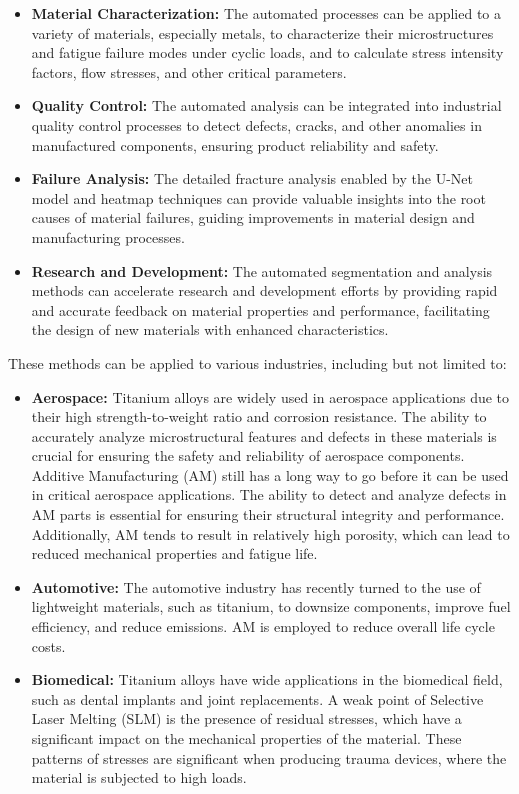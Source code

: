 \documentclass[preprint,12pt]{elsarticle}
\begin{document}
\begin{itemize}
    \item \textbf{Material Characterization:} The automated processes can be applied to a variety of materials, especially metals, to characterize their microstructures and fatigue failure modes under cyclic loads, and to calculate stress intensity factors, flow stresses, and other critical parameters.
    \item \textbf{Quality Control:} The automated analysis can be integrated into industrial quality control processes to detect defects, cracks, and other anomalies in manufactured components, ensuring product reliability and safety.
    \item \textbf{Failure Analysis:} The detailed fracture analysis enabled by the U-Net model and heatmap techniques can provide valuable insights into the root causes of material failures, guiding improvements in material design and manufacturing processes.
    \item \textbf{Research and Development:} The automated segmentation and analysis methods can accelerate research and development efforts by providing rapid and accurate feedback on material properties and performance, facilitating the design of new materials with enhanced characteristics.
\end{itemize}

These methods can be applied to various industries, including but not limited to:

\begin{itemize}
    \item \textbf{Aerospace:} Titanium alloys are widely used in aerospace applications due to their high strength-to-weight ratio and corrosion resistance. The ability to accurately analyze microstructural features and defects in these materials is crucial for ensuring the safety and reliability of aerospace components. Additive Manufacturing (AM) still has a long way to go before it can be used in critical aerospace applications. The ability to detect and analyze defects in AM parts is essential for ensuring their structural integrity and performance. Additionally, AM tends to result in relatively high porosity, which can lead to reduced mechanical properties and fatigue life. ~\cite{montanari2023additive}
    \item \textbf{Automotive:} The automotive industry has recently turned to the use of lightweight materials, such as titanium, to downsize components, improve fuel efficiency, and reduce emissions. AM is employed to reduce overall life cycle costs.~\cite{nyamekye2023impact}
    \item \textbf{Biomedical:} Titanium alloys have wide applications in the biomedical field, such as dental implants and joint replacements. A weak point of Selective Laser Melting (SLM) is the presence of residual stresses, which have a significant impact on the mechanical properties of the material. These patterns of stresses are significant when producing trauma devices, where the material is subjected to high loads.~\cite{marin2023biomedical}
\end{itemize}
\end{document}
